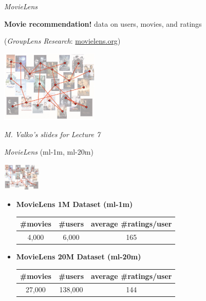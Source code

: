 \documentclass[10pt,frenchb]{beamer}
\begin{document}
\begin{frame}{\textit{MovieLens}}

\textbf{Movie recommendation!} data on users, movies, and ratings\\
\begin{center}
(\textit{GroupLens Research}: \url{movielens.org})
\end{center}

\begin{center}
\includegraphics[height=130px]{images/movielens.png}
\end{center}
\begin{center}
\textit{M. Valko's slides for Lecture 7}
\end{center}

\end{frame}

\begin{frame}{\textit{MovieLens} (ml-1m, ml-20m)}

\begin{center}
\includegraphics[height=50px]{images/movielens.png}
\end{center}

\begin{itemize}
\item \textbf{MovieLens 1M Dataset (ml-1m)}\\

\begin{table}
\begin{tabular}{|c|c|c|}
\hline
\textbf{\#movies} & \textbf{\#users} & \textbf{average \#ratings/user}\\
\hline
4,000 & 6,000 & 165\\
\hline
\end{tabular}
\end{table}

\item \textbf{MovieLens 20M Dataset (ml-20m)}\\

\begin{table}
\begin{tabular}{|c|c|c|}
\hline
\textbf{\#movies} & \textbf{\#users} & \textbf{average \#ratings/user}\\
\hline
27,000 & 138,000 & 144\\
\hline
\end{tabular}
\end{table}

\end{itemize}

\end{frame}
\end{document}
